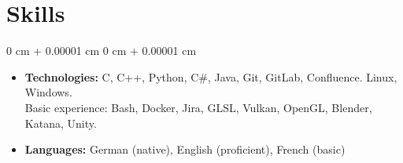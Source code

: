 \documentclass[10pt, letterpaper]{article}
\newenvironment{highlights}{
    \begin{itemize}[
        topsep=0.10 cm,
        parsep=0.10 cm,
        partopsep=0pt,
        itemsep=0pt,
        leftmargin=0 cm + 10pt
    ]
}{
    \end{itemize}
} %
\newenvironment{onecolentry}{
    \begin{adjustwidth}{
        0 cm + 0.00001 cm
    }{
        0 cm + 0.00001 cm
    }
}{
    \end{adjustwidth}
} %
\begin{document}
    \section{Skills}
    \sectspacetop
    \begin{onecolentry}
            \begin{highlights}
                \item \textbf{Technologies:} C, C++, Python, C\#, Java, Git, GitLab, Confluence. Linux, Windows.\\
                 Basic experience: Bash, Docker, Jira, GLSL, Vulkan, OpenGL, Blender, Katana, Unity.
                 \expspace
                \item \textbf{Languages:} German (native), English (proficient), French (basic)
            \end{highlights}
        \end{onecolentry}
    
\newcommand{\vspacepubl}{\expspace}    
\end{document}
